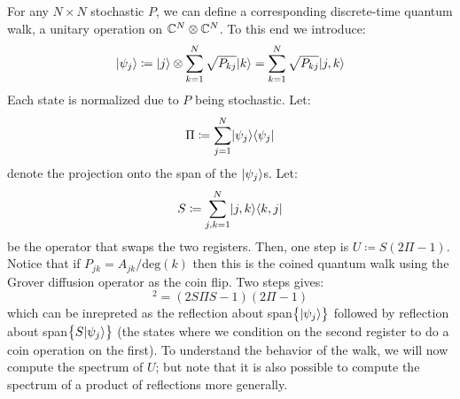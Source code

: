 For any $N \times N$ stochastic $P$, we can define a corresponding discrete-time quantum walk, a unitary operation on $\mathbb{C}^N \otimes \mathbb{C}^N$. To this end we introduce:
\begin{equation}
    \lvert \psi_j \rangle \coloneqq \lvert j \rangle \otimes \sum_{k=1}^N \sqrt{P_{kj}}\lvert k \rangle = \sum_{k=1}^N\sqrt{P_{kj}}\lvert j,k \rangle
\end{equation}
Each state is normalized due to $P$ being stochastic. Let:
\begin{equation}
    \Pi \coloneqq \sum_{j=1}^N \lvert \psi_j \rangle \langle \psi_j \rvert
\end{equation}
denote the projection onto the span of the $\lvert \psi_j \rangle$s. Let:
\begin{equation}
    S \coloneqq \sum_{j, k = 1}^N \lvert j, k \rangle \langle k, j \rvert
\end{equation}
be the operator that swaps the two registers. Then, one step is $U \coloneqq S(2\Pi - 1)$. Notice that if $P_{jk} = A_{jk}/\text{deg}(k)$ then this is the coined quantum walk using the Grover diffusion operator as the coin flip. Two steps gives:
\begin{equation}
    [S(2\Pi - 1)]^2 = (2S\Pi S - 1)(2\Pi - 1)
\end{equation}
which can be inrepreted as the reflection about span$\set{\lvert \psi_j \rangle}$ followed by reflection about span$\set{S\lvert \psi_j \rangle}$ (the states where we condition on the second register to do a coin operation on the first). To understand the behavior of the walk, we will now compute the spectrum of $U$; but note that it is also possible to compute the spectrum of a product of reflections more generally.